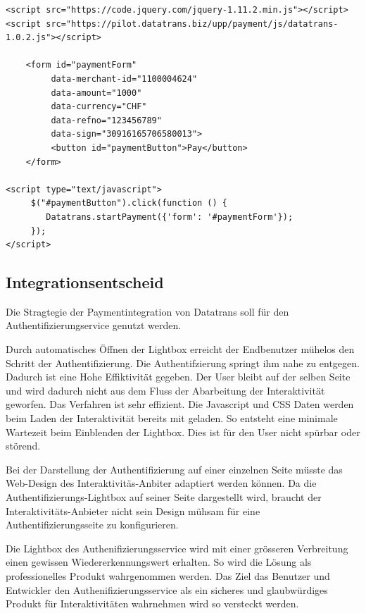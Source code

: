 \begin{verbatim}
<script src="https://code.jquery.com/jquery-1.11.2.min.js"></script>
<script src="https://pilot.datatrans.biz/upp/payment/js/datatrans-1.0.2.js"></script>

    <form id="paymentForm"
         data-merchant-id="1100004624"
         data-amount="1000"
         data-currency="CHF"
         data-refno="123456789"
         data-sign="30916165706580013">
         <button id="paymentButton">Pay</button>
    </form>
    
<script type="text/javascript">
     $("#paymentButton").click(function () {
        Datatrans.startPayment({'form': '#paymentForm'});
     });
</script>
\end{verbatim}

\subsection{Integrationsentscheid}\label{integrationsentscheid}

Die Stragtegie der Paymentintegration von Datatrans soll für den
Authentifizierungservice genutzt werden.

Durch automatisches Öffnen der Lightbox erreicht der Endbenutzer mühelos
den Schritt der Authentifizierung. Die Authentifzierung springt ihm nahe
zu entgegen. Dadurch ist eine Hohe Effiktivität gegeben. Der User bleibt
auf der selben Seite und wird dadurch nicht aus dem Fluss der
Abarbeitung der Interaktivität geworfen. Das Verfahren ist sehr
effizient. Die Javascript und CSS Daten werden beim Laden der
Interaktivität bereits mit geladen. So entsteht eine minimale Wartezeit
beim Einblenden der Lightbox. Dies ist für den User nicht spürbar oder
störend.

Bei der Darstellung der Authentifizierung auf einer einzelnen Seite
müsste das Web-Design des Interaktivitäs-Anbiter adaptiert werden
können. Da die Authentifizierungs-Lightbox auf seiner Seite dargestellt
wird, braucht der Interaktivitäts-Anbieter nicht sein Design mühsam für
eine Authentifizierungsseite zu konfigurieren.

Die Lightbox des Authenifizierungsservice wird mit einer grösseren
Verbreitung einen gewissen Wiedererkennungswert erhalten. So wird die
Lösung als professionelles Produkt wahrgenommen werden. Das Ziel das
Benutzer und Entwickler den Authenifizierungsservice als ein sicheres
und glaubwürdiges Produkt für Interaktivitäten wahrnehmen wird so
versteckt werden.

\newpage

